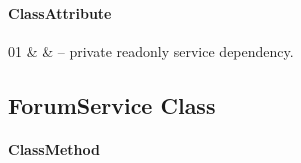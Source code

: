 \paragraph{ClassAttribute}
\begin{ClassAttributeTable}
01 &  &  -- private readonly service dependency. \\ \hline
\end{ClassAttributeTable}

\subsection{ForumService Class}

\paragraph{ClassMethod}
